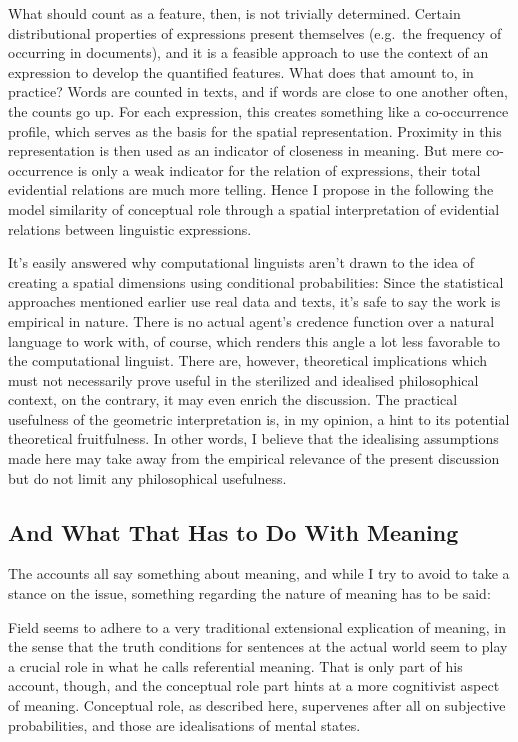 \documentclass[11pt, a4paper]{scrartcl}
\begin{document}
What should count as a feature, then, is not trivially determined. Certain distributional properties of expressions present themselves (e.g.\ the frequency of occurring in documents), and it is a feasible approach to use the context of an expression to develop the quantified features. What does that amount to, in practice? Words are counted in texts, and if words are close to one another often, the counts go up. For each expression, this creates something like a co-occurrence profile, which serves as the basis for the spatial representation. Proximity in this representation is then used as an indicator of closeness in meaning. But mere co-occurrence is only a weak indicator for the relation of expressions, their total evidential relations are much more telling. Hence I propose in the following the model similarity of conceptual role through a spatial interpretation of evidential relations between linguistic expressions. 

It's easily answered why computational linguists aren't drawn to the idea of creating a spatial dimensions using conditional probabilities: Since the statistical approaches mentioned earlier use real data and texts, it's safe to say the work is empirical in nature. There is no actual agent's credence function over a natural language to work with, of course, which renders this angle a lot less favorable to the computational linguist. There are, however, theoretical implications which must not necessarily prove useful in the sterilized and idealised philosophical context, on the contrary, it may even enrich the discussion. The practical usefulness of the geometric interpretation is, in my opinion, a hint to its potential theoretical fruitfulness. In other words, I believe that the idealising assumptions made here may take away from the empirical relevance of the present discussion but do not limit any philosophical usefulness.

\subsection{And What That Has to Do With Meaning}

The accounts all say something about meaning, and while I try to avoid to take a stance on the issue, something regarding the nature of meaning has to be said: 

Field seems to adhere to a very traditional extensional explication of meaning, in the sense that the truth conditions for sentences at the actual world seem to play a crucial role in what he calls referential meaning. That is only part of his account, though, and the conceptual role part hints at a more cognitivist aspect of meaning. Conceptual role, as described here, supervenes after all on subjective probabilities, and those are idealisations of mental states. 
\end{document}
